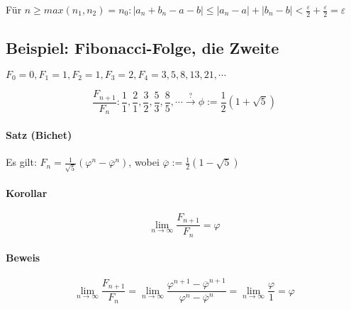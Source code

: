 \documentclass[14pt,a4paper]{article}
\begin{document}
    Für $ n \geq max(n_1, n_2) = n_0 : |a_n + b_n -a - b | \stackrel{}{\leq} |a_n - a| + |b_n - b| <
    \frac{\varepsilon}{2} + \frac{\varepsilon}{2} = \varepsilon $

    \subsection{Beispiel: Fibonacci-Folge, die Zweite}
    $ F_0 = 0, F_1 = 1, F_2 = 1, F_3 = 2, F_4 = 3, 5, 8, 13, 21, \dotsb $

    $$ \frac{F_{n+1}}{F_n} : \frac{1}{1}, \frac{2}{1}, \frac{3}{2},
    \frac{5}{3}, \frac{8}{5}, \dotsb \stackrel{?}{\to} \phi := \frac{1}{2}(1 +
    \sqrt{5}) $$

    \paragraph{Satz (Bichet)}
    Es gilt: $F_n = \frac{1}{\sqrt{5}} (\varphi^n - \overline{\varphi}^n) $, wobei $
    \overline{\varphi} := \frac{1}{2}(1-\sqrt{5}) $

    \paragraph{Korollar}
    $$ \lim_{n\to\infty} \frac{F_{n+1}}{F_n} = \varphi$$

    \paragraph{Beweis}
    $$ \lim_{n\to\infty} \frac{F_{n+1}}{F_n} = \lim_{n\to\infty}
    \frac{\varphi^{n+1} - \overline{\varphi}^{n+1}}{\varphi^{n} -
      \overline{\varphi}^{n}} = \lim_{n\to\infty} \frac{\varphi}{1} = \varphi$$
\end{document}
